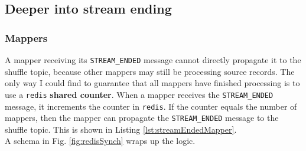 \subsection{Deeper into stream ending}
\label{sec:streamEnding}

\subsubsection{Mappers}
A mapper receiving its \verb|STREAM_ENDED| message cannot directly propagate it to the shuffle topic, because other mappers may still be processing source records.
The only way I could find to guarantee that all mappers have finished processing is to use a \texttt{redis} \textbf{shared counter}.
When a mapper receives the \verb|STREAM_ENDED| message, it increments the counter in \texttt{redis}.
If the counter equals the number of mappers, then the mapper can propagate the \verb|STREAM_ENDED| message to the shuffle topic.
This is shown in Listing \ref{lst:streamEndedMapper}.\\
A schema in Fig. \ref{fig:redisSynch} wraps up the logic.

